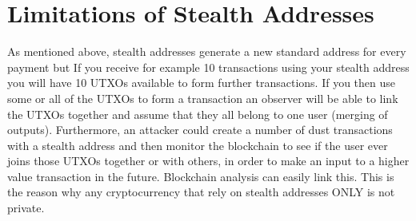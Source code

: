 \section{Limitations of Stealth Addresses}
As mentioned above, stealth addresses generate a new standard address for every payment but If you receive for example 10 transactions using your stealth address you will have 10 UTXOs available to form further transactions. If you then use some or all of the UTXOs to form a transaction an observer will be able to link the UTXOs together and assume that they all belong to one user (merging of outputs). Furthermore, an attacker could create a number of dust transactions with a stealth address and then monitor the blockchain to see if the user ever joins those UTXOs together or with others, in order to make an input to a higher value transaction in the future. Blockchain analysis can easily link this. This is the reason why any cryptocurrency that rely on stealth addresses ONLY is not private.